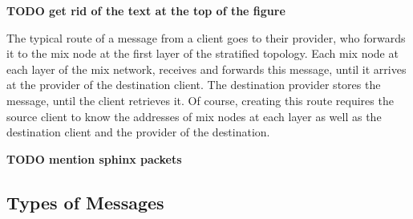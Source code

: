 \documentclass[a4paper,11pt,oneside]{report}
\begin{document}
\textbf{TODO get rid of the text at the top of the figure}

The typical route of a message from a client goes to their provider, who forwards it to the mix node at the first layer of the stratified topology. Each mix node at each layer of the mix network, receives and forwards this message, until it arrives at the provider of the destination client. The destination provider stores the message, until the client retrieves it. Of course, creating this route requires the source client to know the addresses of mix nodes at each layer as well as the destination client and the provider of the destination.

\textbf{TODO mention sphinx packets}
\subsection{Types of Messages}
\end{document}
